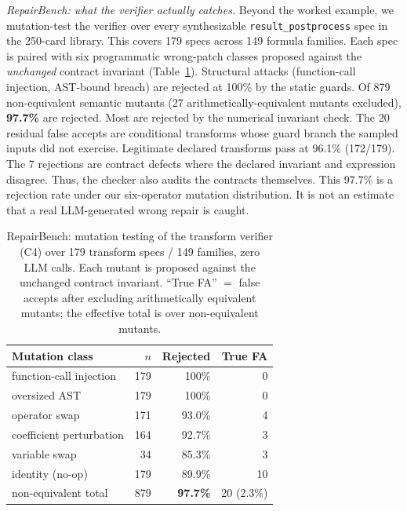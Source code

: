 \emph{RepairBench: what the verifier actually catches.}
Beyond the worked example, we mutation-test the verifier over every synthesizable \texttt{result\_postprocess} spec in the 250-card library.
This covers 179 specs across 149 formula families.
Each spec is paired with six programmatic wrong-patch classes proposed against the \emph{unchanged} contract invariant (Table~\ref{tab:repairbench}).
Structural attacks (function-call injection, AST-bound breach) are rejected at 100\% by the static guards.
Of 879 non-equivalent semantic mutants (27 arithmetically-equivalent mutants excluded), \textbf{97.7\%} are rejected.
Most are rejected by the numerical invariant check.
The 20 residual false accepts are conditional transforms whose guard branch the sampled inputs did not exercise.
Legitimate declared transforms pass at 96.1\% (172/179).
The 7 rejections are contract defects where the declared invariant and expression disagree.
Thus, the checker also audits the contracts themselves.
This 97.7\% is a rejection rate under our six-operator mutation distribution.
It is not an estimate that a real LLM-generated wrong repair is caught.

\begin{table}[t]
\caption{RepairBench: mutation testing of the transform verifier (C4) over 179 transform specs / 149 families, zero LLM calls.
Each mutant is proposed against the unchanged contract invariant.
``True FA'' $=$ false accepts after excluding arithmetically equivalent mutants; the effective total is over non-equivalent mutants.}
\label{tab:repairbench}
\small
\begin{tabular}{@{}lrrr@{}}
\toprule
Mutation class & $n$ & Rejected & True FA \\
\midrule
function-call injection & 179 & 100\% & 0 \\
oversized AST & 179 & 100\% & 0 \\
operator swap & 171 & 93.0\% & 4 \\
coefficient perturbation & 164 & 92.7\% & 3 \\
variable swap & 34 & 85.3\% & 3 \\
identity (no-op) & 179 & 89.9\% & 10 \\
\midrule
non-equivalent total & 879 & \textbf{97.7\%} & 20 (2.3\%) \\
\bottomrule
\end{tabular}
\end{table}

